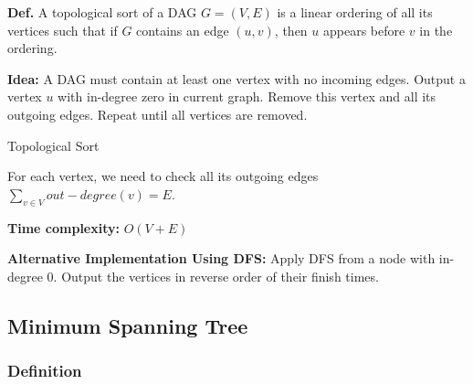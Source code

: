 \documentclass[10pt]{article}
\begin{document}
\textbf{Def.} A topological sort of a DAG $G = (V, E)$ is a linear ordering of all its vertices such that if $G$ contains an edge $(u, v)$, then $u$ appears before $v$ in the ordering.

\textbf{Idea:} A DAG must contain at least one vertex with no incoming edges. Output a vertex $u$ with in-degree zero in current graph. Remove this vertex and all its outgoing edges. Repeat until all vertices are removed.

\begin{algorithm}
	\SetAlgoLined
	
	\caption{Topological Sort}

\end{algorithm}

For each vertex, we need to check all its outgoing edges $\sum_{v\in V} out-degree(v) = E$.

\textbf{Time complexity:} $O(V+E)$

\textbf{Alternative Implementation Using DFS:} Apply DFS from a node with in-degree 0. Output the vertices in reverse order of their finish times.

\newpage
\subsection{Minimum Spanning Tree}

\subsubsection{Definition}
\end{document}
